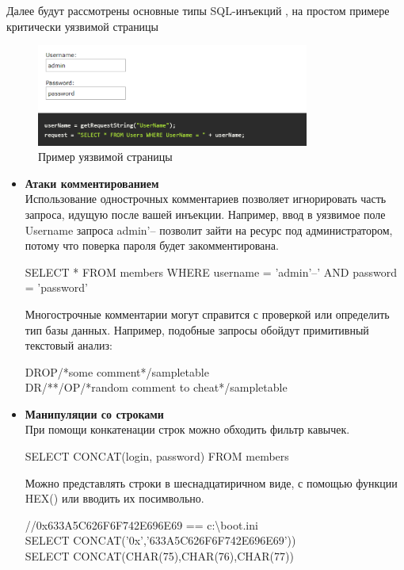 Далее будут рассмотрены основные типы SQL-инъекций \autocite{proglib},\autocite{SqlInjection} на простом примере критически уязвимой страницы
\begin{figure}[h]
    \centering
    \includegraphics[width=0.8\textwidth]{assets/sql_ijection_example.png}
    \caption{Пример уязвимой страницы}
    \label{fig:mesh1}
\end{figure}

\begin{itemize}
    \item \textbf{Атаки комментированием}\\
    Использование однострочных комментариев позволяет игнорировать часть запроса, идущую после вашей инъекции. Например, ввод в уязвимое поле Username запроса admin'-- позволит зайти на ресурс под администратором, потому что поверка пароля будет закомментирована.\\
    \begin{grayquote}
        SELECT * FROM members WHERE username = 'admin'--' AND password = 'password'
    \end{grayquote}

    Многострочные комментарии могут справится с проверкой или определить тип базы данных.
    Например, подобные запросы обойдут примитивный текстовый анализ:\\
    \begin{grayquote}
        DROP/*some comment*/sampletable\\
        DR/**/OP/*random comment to cheat*/sampletable
    \end{grayquote}

    \item \textbf{Манипуляции со строками}\\
    При помощи конкатенации строк можно обходить фильтр кавычек.\\
    \begin{grayquote}
        SELECT CONCAT(login, password) FROM members
    \end{grayquote}

    Можно представлять строки в шеснадцатиричном виде, с помощью функции HEX() или вводить их посимвольно.
    \begin{grayquote}
        //0x633A5C626F6F742E696E69 == c:\textbackslash boot.ini\\
        SELECT CONCAT('0x','633A5C626F6F742E696E69'))\\
        SELECT CONCAT(CHAR(75),CHAR(76),CHAR(77))
    \end{grayquote}


\end{itemize}

